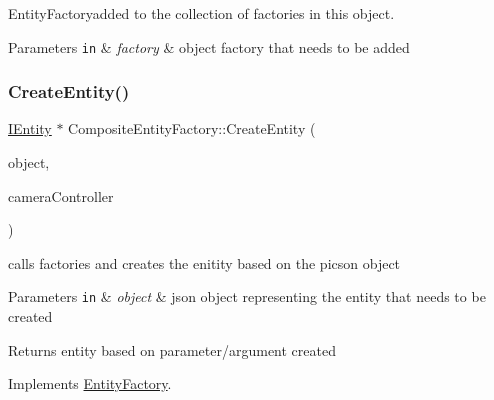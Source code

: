 Entity\+Factoryadded to the collection of factories in this object. 


\begin{DoxyParams}[1]{Parameters}
\mbox{\tt in}  & {\em factory} & object factory that needs to be added \\
\hline
\end{DoxyParams}
\mbox{\label{classCompositeEntityFactory_a97b2f95333369f946d0f3ab2116b5f19}} 
\subsubsection{\texorpdfstring{Create\+Entity()}{CreateEntity()}}
{\footnotesize\ttfamily \hyperlink{classIEntity}{I\+Entity} $\ast$ Composite\+Entity\+Factory\+::\+Create\+Entity (\begin{DoxyParamCaption}\item[{picojson\+::object \&}]{object,  }\item[{\hyperlink{classICameraController}{I\+Camera\+Controller} \&}]{camera\+Controller }\end{DoxyParamCaption})\hspace{0.3cm}{\ttfamily [virtual]}}



calls factories and creates the enitity based on the picson object 


\begin{DoxyParams}[1]{Parameters}
\mbox{\tt in}  & {\em object} & json object representing the entity that needs to be created\\
\hline
\end{DoxyParams}
\begin{DoxyReturn}{Returns}
entity based on parameter/argument created 
\end{DoxyReturn}


Implements \hyperlink{classEntityFactory_a7f579ca02f15935e6901e5c955c9726a}{Entity\+Factory}.

\mbox{\label{classCompositeEntityFactory_aa53621c622f2dbbf57dc8b3f698c1c59}} 
